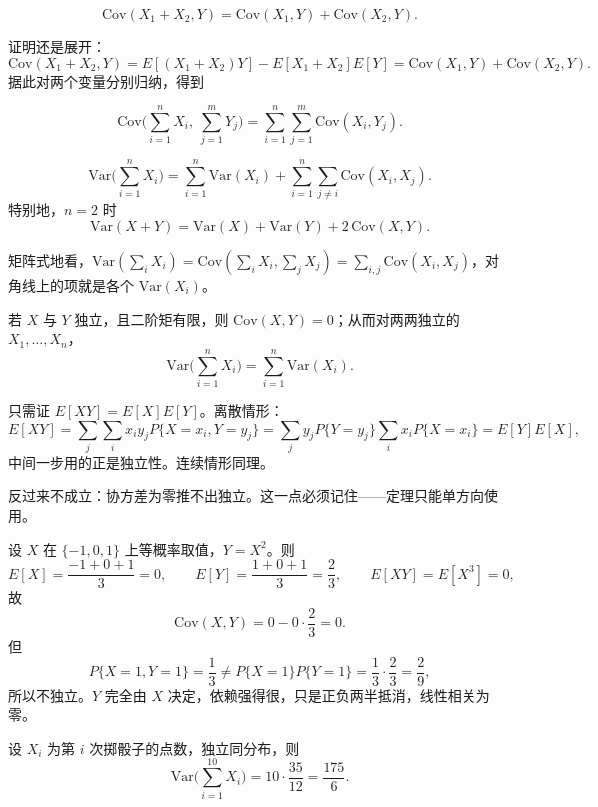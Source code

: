 \begin{lemma}
\[
\mathrm{Cov}(X_1+X_2,Y)=\mathrm{Cov}(X_1,Y)+\mathrm{Cov}(X_2,Y).
\]
\end{lemma}

证明还是展开：
\[
\mathrm{Cov}(X_1+X_2,Y)=E[(X_1+X_2)Y]-E[X_1+X_2]E[Y]
=\mathrm{Cov}(X_1,Y)+\mathrm{Cov}(X_2,Y).
\]
据此对两个变量分别归纳，得到

\begin{proposition}[双线性]
\[
\mathrm{Cov}\Big(\sum_{i=1}^nX_i,\ \sum_{j=1}^mY_j\Big)=\sum_{i=1}^n\sum_{j=1}^m\mathrm{Cov}(X_i,Y_j).
\]
\end{proposition}

\begin{corollary}[和的方差]
\[
\mathrm{Var}\Big(\sum_{i=1}^nX_i\Big)=\sum_{i=1}^n\mathrm{Var}(X_i)+\sum_{i=1}^n\sum_{j\ne i}\mathrm{Cov}(X_i,X_j).
\]
特别地，$n=2$ 时
\[
\mathrm{Var}(X+Y)=\mathrm{Var}(X)+\mathrm{Var}(Y)+2\,\mathrm{Cov}(X,Y).
\]
\end{corollary}

矩阵式地看，$\mathrm{Var}(\sum_iX_i)=\mathrm{Cov}(\sum_iX_i,\sum_jX_j)=\sum_{i,j}\mathrm{Cov}(X_i,X_j)$，对角线上的项就是各个 $\mathrm{Var}(X_i)$。

\begin{theorem}[独立则协方差为零]
若 $X$ 与 $Y$ 独立，且二阶矩有限，则 $\mathrm{Cov}(X,Y)=0$；从而对两两独立的 $X_1,\dots,X_n$，
\[
\mathrm{Var}\Big(\sum_{i=1}^nX_i\Big)=\sum_{i=1}^n\mathrm{Var}(X_i).
\]
\end{theorem}

只需证 $E[XY]=E[X]E[Y]$。离散情形：
\[
E[XY]=\sum_j\sum_ix_iy_jP\{X=x_i,Y=y_j\}
=\sum_jy_jP\{Y=y_j\}\sum_ix_iP\{X=x_i\}=E[Y]E[X],
\]
中间一步用的正是独立性。连续情形同理。

\begin{remark}
反过来不成立：协方差为零推不出独立。这一点必须记住——定理只能单方向使用。
\end{remark}

\begin{example}[零协方差但不独立]
设 $X$ 在 $\{-1,0,1\}$ 上等概率取值，$Y=X^2$。则
\[
E[X]=\frac{-1+0+1}{3}=0,\qquad
E[Y]=\frac{1+0+1}{3}=\frac23,\qquad
E[XY]=E[X^3]=0,
\]
故
\[
\mathrm{Cov}(X,Y)=0-0\cdot\frac23=0 .
\]
但
\[
P\{X=1,Y=1\}=\frac13\ne P\{X=1\}P\{Y=1\}=\frac13\cdot\frac23=\frac29,
\]
所以不独立。$Y$ 完全由 $X$ 决定，依赖强得很，只是正负两半抵消，线性相关为零。
\end{example}

\begin{example}[十次掷骰子之和]
设 $X_i$ 为第 $i$ 次掷骰子的点数，独立同分布，则
\[
\mathrm{Var}\Big(\sum_{i=1}^{10}X_i\Big)=10\cdot\frac{35}{12}=\frac{175}{6}.
\]
\end{example}


